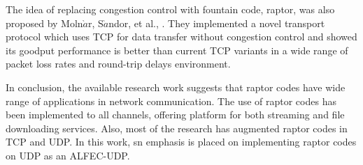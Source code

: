 The idea of replacing congestion control with fountain code, raptor, was also proposed by Moln$\grave{a}$r, S$\grave{a}$ndor, et al., \cite{molnar2013data}. They implemented a novel transport protocol which uses TCP for data transfer without congestion control and showed its goodput performance is better than current TCP variants in a wide range of packet loss rates and round-trip delays environment.

In conclusion, the available research work suggests that raptor codes have wide range of applications in network communication. The use of raptor codes has been implemented to all channels, offering platform for both streaming and file downloading services. Also, most of the research has augmented raptor codes in TCP and UDP. In this work, sn emphasis is placed on implementing raptor codes on UDP as an ALFEC-UDP.


\par
\par
\par



